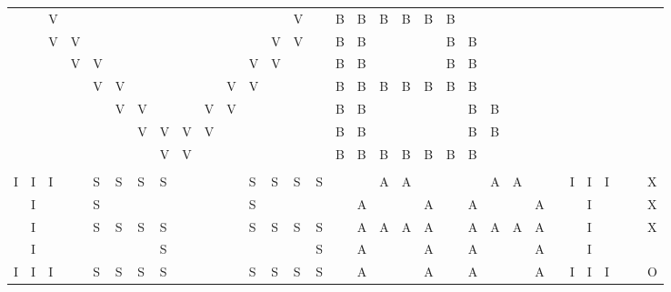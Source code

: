 \begin{tabular}{lllllllllllllllllllllllllllllll}
&&V&&&&&&&&&&&V&&B&B&B&B&B&B&&&&&&&&&&&\\
&&V&V&&&&&&&&&V&V&&B&B&&&&B&B&&&&&&&&&&\\
&&&V&V&&&&&&&V&V&&&B&B&&&&B&B&&&&&&&&&&\\
&&&&V&V&&&&&V&V&&&&B&B&B&B&B&B&B&&&&&&&&&&\\
&&&&&V&V&&&V&V&&&&&B&B&&&&&B&B&&&&&&&&&\\
&&&&&&V&V&V&V&&&&&&B&B&&&&&B&B&&&&&&&&&\\
&&&&&&&V&V&&&&&&&B&B&B&B&B&B&B&&&&&&&&&&\\
&&&&&&&&&&&&&&&&&&&&&&&&&&&&&&&\\
I&I&I&&S&S&S&S&&&&S&S&S&S&&&A&A&&&&A&A&&&I&I&I&&&X\\
&I&&&S&&&&&&&S&&&&&A&&&A&&A&&&A&&&I&&&&X\\
&I&&&S&S&S&S&&&&S&S&S&S&&A&A&A&A&&A&A&A&A&&&I&&&&X\\
&I&&&&&&S&&&&&&&S&&A&&&A&&A&&&A&&&I&&&& \\
I&I&I&&S&S&S&S&&&&S&S&S&S&&A&&&A&&A&&&A&&I&I&I&&&O\\
\end{tabular}
